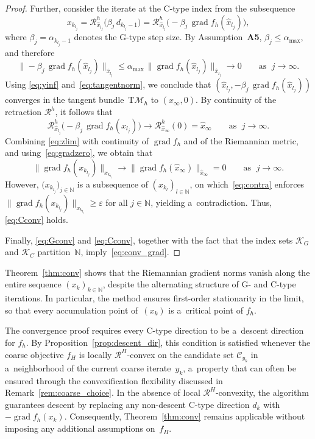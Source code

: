 \documentclass[11pt,reqno]{amsart}
\theoremstyle{plain}
\newcommand\N{\mathbb N}
\DeclareMathOperator{\grad}{grad}
\newcommand\calC{\mathcal C}
\newcommand\calK{\mathcal K}
\newcommand{\M}{\mathcal{M}}
\newcommand{\Tan}{\mathrm{T}}
\newcommand{\Ret}{\mathcal R}
\begin{document}
\begin{proof}
		Further, consider the iterate at the C-type index from the subsequence 
		\[
		x_{k_{l_j}} 
		= \Ret_{\hat{x}_{l_j}}^h\!\bigl(\beta_j \,d_{k_{l_j}-1}\bigr)
		= \Ret_{\hat{x}_{l_j}}^h\!\bigl(-\beta_j \,\grad f_h(\hat{x}_{l_j})\bigr),
		\]
		where $\beta_j = \alpha_{k_{l_j}-1}$ denotes the G-type step size.
		By Assumption~\textbf{A5}, $\beta_j \le \alpha_{\max}$, and therefore
		\begin{equation}\label{eq:tangentnorm}
			\|-\beta_j\,\grad f_h(\hat{x}_{l_j})\|_{\hat{x}_{l_j}}
			\le \alpha_{\max}\,\|\grad f_h(\hat{x}_{l_j})\|_{\hat{x}_{l_j}}
			\rightarrow0 \qquad\text{as } \;j \rightarrow \infty.
		\end{equation}
		Using \eqref{eq:yinf} and~\eqref{eq:tangentnorm}, we conclude that $(\hat{x}_{l_j}, -\beta_j\,\grad f_h(\hat{x}_{l_j}))$ converges in the tangent bundle~$\Tan\M_h$ to $(\hat{x}_\infty, 0)$. By continuity of the retraction $\Ret^h$, it follows that
		\begin{equation}\label{eq:zlim}
			\Ret_{\hat{x}_{l_j}}^h\!\bigl(-\beta_j\,\grad f_h(\hat{x}_{l_j})\bigr)
			\rightarrow \Ret_{\hat{x}_\infty}^h(0) = \hat{x}_\infty \qquad\text{as } \; j \rightarrow \infty.
		\end{equation}
		Combining \eqref{eq:zlim} with continuity of $\grad f_h$ and of the Riemannian metric, and using~\eqref{eq:gradzero}, we obtain that
		\[
		\|\grad f_h(x_{k_{l_j}})\|_{x_{k_{l_j}}}
		\rightarrow \|\grad f_h(\hat{x}_\infty)\|_{\hat{x}_\infty}
		= 0 \qquad\text{as } \; j \rightarrow \infty.
		\]
		However, $\big(x_{k_{l_j}}\big)_{j\in\N}$ is a subsequence of 
		$(x_{k_l})_{l\in\N}$, on which~\eqref{eq:contra} enforces
		\mbox{$\|\grad f_h(x_{k_{l_j}})\|_{x_{k_{l_j}}} \!\ge \varepsilon$} for all $j\in\N$, yielding a~contradiction. Thus, \eqref{eq:Cconv} holds.
		
		Finally, \eqref{eq:Gconv} and \eqref{eq:Cconv}, together with the fact that the index sets $\calK_G$ and $\calK_C$ partition~$\N$, imply~\eqref{eq:conv_grad}.
	\end{proof}
	
	Theorem~\ref{thm:conv} shows that the Riemannian gradient norms vanish along the entire sequence $(x_k)_{k\in\N}$, despite the alternating structure of G- and C-type iterations. In particular, the method ensures first-order stationarity in the limit, so that every accumulation point of~$(x_k)$ is a~critical point of $f_h$.
	
	The convergence proof requires every C-type direction to be a~descent direction for $f_h$. By Proposition~\ref{prop:descent_dir}, this condition is satisfied whenever the coarse objective $f_H$ is locally \mbox{$\Ret^H$-con}\-vex on the candidate set $\calC_{y_k}$ in a~neighborhood of the current coarse iterate~$y_k$, a~property that can often be ensured through the convexification flexibility discussed in Remark~\ref{rem:coarse_choice}. 
	In the absence of local $\Ret^H$-convexity, the algorithm guarantees descent by replacing any non-descent \mbox{C-type} direction $d_k$ with $-\grad f_h(x_k)$. Consequently, Theorem~\ref{thm:conv} remains applicable without imposing any additional assumptions on~$f_H$.
	
\end{document}
